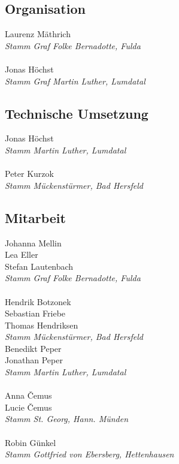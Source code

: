 \begin{centering}
\begin{multicols}{2}

\subsection*{Organisation}
Laurenz Mäthrich \\ \textit{Stamm Graf Folke Bernadotte, Fulda} \\ ~\\
Jonas Höchst \\ \textit{Stamm Graf Martin Luther, Lumdatal}

\subsection*{Technische Umsetzung}
Jonas Höchst \\ \textit{Stamm Martin Luther, Lumdatal} \\ ~\\
Peter Kurzok \\ \textit{Stamm Mückenstürmer, Bad Hersfeld}

\subsection*{Mitarbeit}
Johanna Mellin \\ Lea Eller \\ Stefan Lautenbach \\ \textit{Stamm Graf Folke Bernadotte, Fulda} \\ ~\\
Hendrik Botzonek \\ Sebastian Friebe \\ Thomas Hendriksen \\ \textit{Stamm Mückenstürmer, Bad Hersfeld} \\ \columnbreak
Benedikt Peper \\ Jonathan Peper \\ \textit{Stamm Martin Luther, Lumdatal} \\ ~\\
Anna \v{C}emus \\ Lucie \v{C}emus \\ \textit{Stamm St. Georg, Hann. Münden} \\ ~\\
Robin Günkel \\ \textit{Stamm Gottfried von Ebersberg, Hettenhausen} \\


\end{multicols}
\end{centering}
